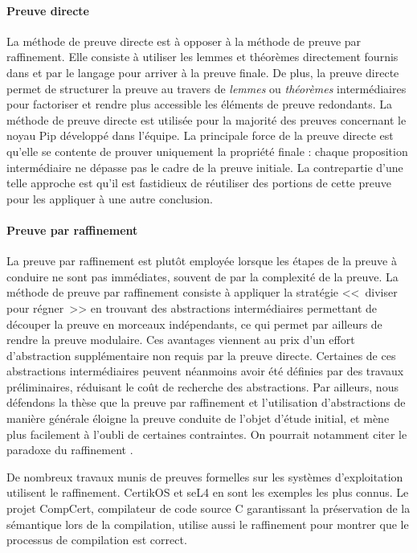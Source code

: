 			\paragraph{Preuve directe} La méthode de preuve directe est à opposer à la méthode de preuve par raffinement. Elle consiste à utiliser les lemmes et théorèmes directement fournis dans et par le langage pour arriver à la preuve finale. De plus, la preuve directe permet de structurer la preuve au travers de \emph{lemmes} ou \emph{théorèmes} intermédiaires pour factoriser et rendre plus accessible les éléments de preuve redondants. La méthode de preuve directe est utilisée pour la majorité des preuves concernant le noyau Pip développé dans l'équipe. La principale force de la preuve directe est qu'elle se contente de prouver uniquement la propriété finale : chaque proposition intermédiaire ne dépasse pas le cadre de la preuve initiale. La contrepartie d'une telle approche est qu'il est fastidieux de réutiliser des portions de cette preuve pour les appliquer à une autre conclusion.
			
			\paragraph{Preuve par raffinement} La preuve par raffinement \cite{refinement} est plutôt employée lorsque les étapes de la preuve à conduire ne sont pas immédiates, souvent de par la complexité de la preuve. La méthode de preuve par raffinement consiste à appliquer la stratégie <<~diviser pour régner~>> en trouvant des abstractions intermédiaires permettant de découper la preuve en morceaux indépendants, ce qui permet par ailleurs de rendre la preuve modulaire. Ces avantages viennent au prix d'un effort d'abstraction supplémentaire non requis par la preuve directe. Certaines de ces abstractions intermédiaires peuvent néanmoins avoir été définies par des travaux préliminaires, réduisant le coût de recherche des abstractions. Par ailleurs, nous défendons la thèse que la preuve par raffinement et l'utilisation d'abstractions de manière générale éloigne la preuve conduite de l'objet d'étude initial, et mène plus facilement à l'oubli de certaines contraintes. On pourrait notamment citer le paradoxe du raffinement \cite{refinementparadox, refinementparadoxsolution}.

			De nombreux travaux munis de preuves formelles sur les systèmes d'exploitation utilisent le raffinement. CertikOS et seL4 en sont les exemples les plus connus. Le projet CompCert, compilateur de code source C garantissant la préservation de la sémantique lors de la compilation, utilise aussi le raffinement pour montrer que le processus de compilation est correct.

